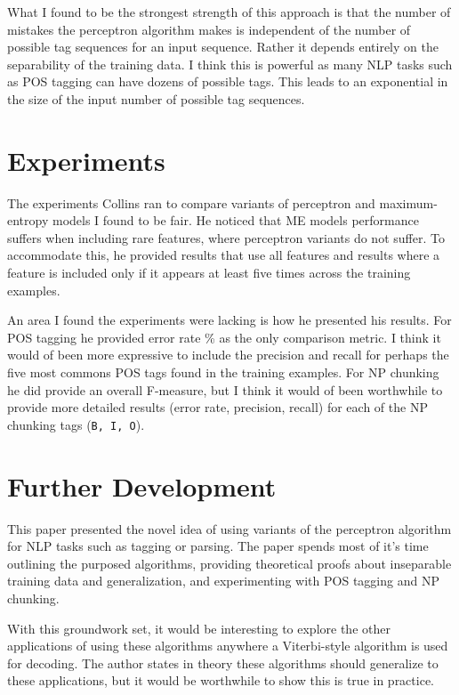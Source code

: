 \documentclass[fleqn,11pt]{wlpeerj} %
\begin{document}
What I found to be the strongest strength of this approach is that the number of mistakes the perceptron algorithm makes is independent of the number of possible tag sequences for an input sequence. Rather it depends entirely on the separability of the training data. I think this is powerful as many NLP tasks such as POS tagging can have dozens of possible tags. This leads to an exponential in the size of the input number of possible tag sequences.

\section*{Experiments}

The experiments Collins ran to compare variants of perceptron and maximum-entropy models I found to be fair. He noticed that ME models performance suffers when including rare features, where perceptron variants do not suffer. To accommodate this, he provided results that use all features and results where a feature is included only if it appears at least five times across the training examples.

An area I found the experiments were lacking is how he presented his results. For POS tagging he provided error rate \% as the only comparison metric. I think it would of been more expressive to include the precision and recall for perhaps the five most commons POS tags found in the training examples. For NP chunking he did provide an overall F-measure, but I think it would of been worthwhile to provide more detailed results (error rate, precision, recall) for each of the NP chunking tags ({\tt B, I, O}).

\section*{Further Development}

This paper presented the novel idea of using variants of the perceptron algorithm for NLP tasks such as tagging or parsing. The paper spends most of it's time outlining the purposed algorithms, providing theoretical proofs about inseparable training data and generalization, and experimenting with POS tagging and NP chunking.

With this groundwork set, it would be interesting to explore the other applications of using these algorithms anywhere a Viterbi-style algorithm is used for decoding. The author states in theory these algorithms should generalize to these applications, but it would be worthwhile to show this is true in practice.
\end{document}
